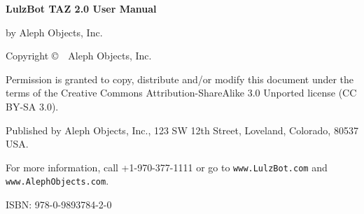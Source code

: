 \clearpage\null\vfill
\begingroup 
\thispagestyle{empty}
\footnotesize\raggedright
\setlength{\parskip}{0.5\baselineskip}

\textbf{LulzBot\textsuperscript{\miniscule{\texttrademark}} TAZ 2.0 User Manual}

by Aleph Objects, Inc.

Copyright \copyright\ \the\year\ Aleph Objects, Inc.\par
Permission is granted to copy, distribute and\slash or modify 
this document under the terms of the
Creative Commons Attribution-ShareAlike 3.0 Unported license
(CC BY-SA 3.0).

Published by Aleph Objects, Inc., 123 SW 12th Street, Loveland, Colorado, 80537 USA.

For more information, call +1-970-377-1111 or go to \texttt{www.LulzBot.com} and \texttt{www.AlephObjects.com}.

ISBN: 978-0-9893784-2-0
\hfill\texttt{\the\year\the\month\the\day}
\endgroup
\pagebreak{}

